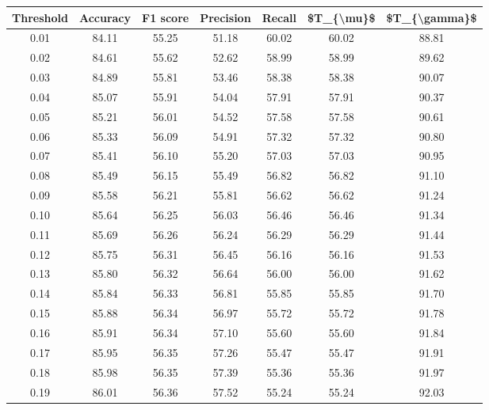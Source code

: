 \begin{tabular}{|c|c|c|c|c|c|c|}
\hline
 Threshold &  Accuracy &  F1 score &  Precision &  Recall &  \$T\_\{\textbackslash mu\}\$ &  \$T\_\{\textbackslash gamma\}\$ \\
\hline
      0.01 &     84.11 &     55.25 &      51.18 &   60.02 &      60.02 &         88.81 \\
      0.02 &     84.61 &     55.62 &      52.62 &   58.99 &      58.99 &         89.62 \\
      0.03 &     84.89 &     55.81 &      53.46 &   58.38 &      58.38 &         90.07 \\
      0.04 &     85.07 &     55.91 &      54.04 &   57.91 &      57.91 &         90.37 \\
      0.05 &     85.21 &     56.01 &      54.52 &   57.58 &      57.58 &         90.61 \\
      0.06 &     85.33 &     56.09 &      54.91 &   57.32 &      57.32 &         90.80 \\
      0.07 &     85.41 &     56.10 &      55.20 &   57.03 &      57.03 &         90.95 \\
      0.08 &     85.49 &     56.15 &      55.49 &   56.82 &      56.82 &         91.10 \\
      0.09 &     85.58 &     56.21 &      55.81 &   56.62 &      56.62 &         91.24 \\
      0.10 &     85.64 &     56.25 &      56.03 &   56.46 &      56.46 &         91.34 \\
      0.11 &     85.69 &     56.26 &      56.24 &   56.29 &      56.29 &         91.44 \\
      0.12 &     85.75 &     56.31 &      56.45 &   56.16 &      56.16 &         91.53 \\
      0.13 &     85.80 &     56.32 &      56.64 &   56.00 &      56.00 &         91.62 \\
      0.14 &     85.84 &     56.33 &      56.81 &   55.85 &      55.85 &         91.70 \\
      0.15 &     85.88 &     56.34 &      56.97 &   55.72 &      55.72 &         91.78 \\
      0.16 &     85.91 &     56.34 &      57.10 &   55.60 &      55.60 &         91.84 \\
      0.17 &     85.95 &     56.35 &      57.26 &   55.47 &      55.47 &         91.91 \\
      0.18 &     85.98 &     56.35 &      57.39 &   55.36 &      55.36 &         91.97 \\
      0.19 &     86.01 &     56.36 &      57.52 &   55.24 &      55.24 &         92.03 \\

\end{tabular}
